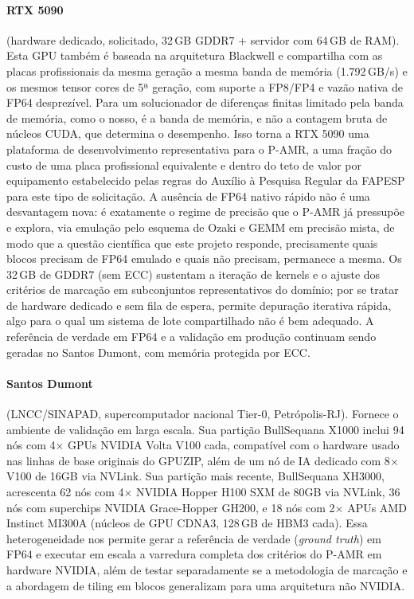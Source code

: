 \documentclass[12pt,a4paper]{article}
\newcommand{\pamr}{P\nobreakdash-AMR}
\begin{document}
\paragraph{RTX 5090} (hardware dedicado, solicitado, 32\,GB GDDR7 + servidor
com 64\,GB de RAM). Esta GPU também é baseada na arquitetura Blackwell e
compartilha com as placas profissionais da mesma geração a mesma banda de
memória (1.792\,GB/s) e os mesmos tensor cores de 5ª geração, com suporte a
FP8/FP4 e vazão nativa de FP64 desprezível. Para um solucionador de
diferenças finitas limitado pela banda de memória, como o nosso, é a banda
de memória, e não a contagem bruta de núcleos CUDA, que determina o
desempenho. Isso torna a RTX 5090 uma plataforma de desenvolvimento
representativa para o \pamr{}, a uma fração do custo de uma placa
profissional equivalente e dentro do teto de valor por equipamento
estabelecido pelas regras do Auxílio à Pesquisa Regular da FAPESP para este
tipo de solicitação. A ausência de FP64 nativo rápido não é uma desvantagem
nova: é exatamente o regime de precisão que o \pamr{} já pressupõe e
explora, via emulação pelo esquema de Ozaki e GEMM em precisão mista, de
modo que a questão científica que este projeto responde, precisamente quais
blocos precisam de FP64 emulado e quais não precisam, permanece a mesma. Os
32\,GB de GDDR7 (sem ECC) sustentam a iteração de kernels e o ajuste dos
critérios de marcação em subconjuntos representativos do domínio; por se
tratar de hardware dedicado e sem fila de espera, permite depuração
iterativa rápida, algo para o qual um sistema de lote compartilhado não é
bem adequado. A referência de verdade em FP64 e a validação em produção
continuam sendo geradas no Santos Dumont, com memória protegida por ECC.

\paragraph{Santos Dumont} (LNCC/SINAPAD, supercomputador nacional Tier-0,
Petrópolis-RJ). Fornece o ambiente de validação em larga escala. Sua partição
BullSequana X1000 inclui 94 nós com 4$\times$ GPUs NVIDIA Volta V100 cada,
compatível com o hardware usado nas linhas de base originais do GPUZIP,
além de um nó de IA dedicado com 8$\times$ V100 de 16GB via NVLink. Sua
partição mais recente, BullSequana XH3000, acrescenta 62 nós com 4$\times$
NVIDIA Hopper H100 SXM de 80GB via NVLink, 36 nós com superchips NVIDIA
Grace-Hopper GH200, e 18 nós com 2$\times$ APUs AMD Instinct MI300A (núcleos
de GPU CDNA3, 128\,GB de HBM3 cada). Essa heterogeneidade nos permite gerar a
referência de verdade (\emph{ground truth}) em FP64 e executar em escala a
varredura completa dos critérios do \pamr{} em hardware NVIDIA, além de testar
separadamente se a metodologia de marcação e a abordagem de tiling em blocos
generalizam para uma arquitetura não NVIDIA.
\end{document}
